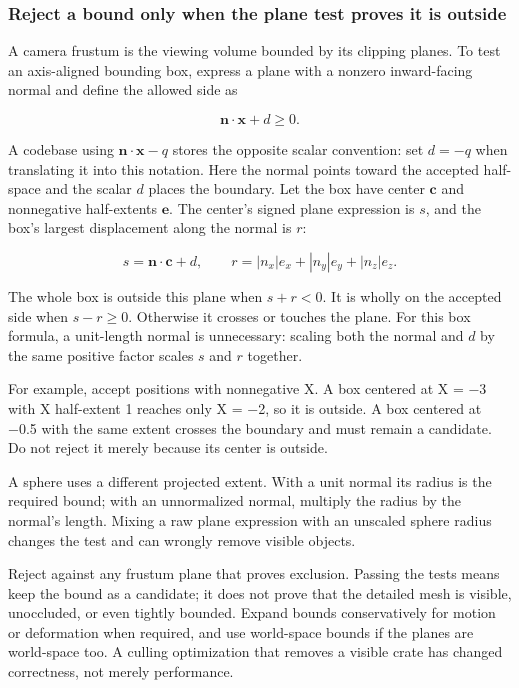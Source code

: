 \subsubsection{Reject a bound only when the plane test proves it is outside}\label{06-engine-ii-ch026-reject-a-bound-only-when-the-plane-test-proves-it-is-outside}

A camera frustum is the viewing volume bounded by its clipping planes. To test an axis-aligned bounding box, express a plane with a nonzero inward-facing normal and define the allowed side as

\[
\mathbf n\cdot\mathbf x+d\geq0.
\]

A codebase using \(\mathbf n\cdot\mathbf x-q\) stores the opposite scalar convention: set \(d=-q\) when translating it into this notation. Here the normal points toward the accepted half-space and the scalar \(d\) places the boundary. Let the box have center \(\mathbf c\) and nonnegative half-extents \(\mathbf e\). The center's signed plane expression is \(s\), and the box's largest displacement along the normal is \(r\):

\[
s=\mathbf n\cdot\mathbf c+d,
\qquad
r=|n_x|e_x+|n_y|e_y+|n_z|e_z.
\]

The whole box is outside this plane when \(s+r<0\). It is wholly on the accepted side when \(s-r\geq0\). Otherwise it crosses or touches the plane. For this box formula, a unit-length normal is unnecessary: scaling both the normal and \(d\) by the same positive factor scales \(s\) and \(r\) together.

For example, accept positions with nonnegative X. A box centered at X = −3 with X half-extent 1 reaches only X = −2, so it is outside. A box centered at −0.5 with the same extent crosses the boundary and must remain a candidate. Do not reject it merely because its center is outside.

A sphere uses a different projected extent. With a unit normal its radius is the required bound; with an unnormalized normal, multiply the radius by the normal's length. Mixing a raw plane expression with an unscaled sphere radius changes the test and can wrongly remove visible objects.

Reject against any frustum plane that proves exclusion. Passing the tests means keep the bound as a candidate; it does not prove that the detailed mesh is visible, unoccluded, or even tightly bounded. Expand bounds conservatively for motion or deformation when required, and use world-space bounds if the planes are world-space too. A culling optimization that removes a visible crate has changed correctness, not merely performance.

